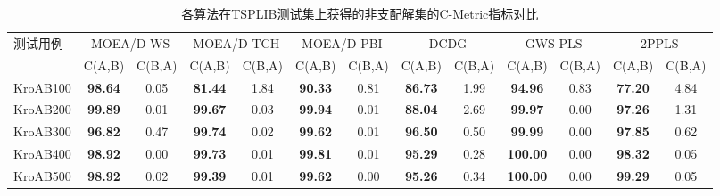 \begin{table}[h]
    \small
    \renewcommand\arraystretch{1.2}
    \renewcommand\tabcolsep{2pt}
    \centering
    \caption{各算法在TSPLIB测试集上获得的非支配解集的C-Metric指标对比 \label{tab:各算法在TSPLIB测试集上获得的非支配解集的C-Metric指标对比}}
    \begin{threeparttable}
        \begin{tabular}{lcccccccccccc}
            \toprule
            \multirow{2}[4]{*}{测试用例} & \multicolumn{2}{c}{MOEA/D-WS} & \multicolumn{2}{c}{MOEA/D-TCH} & \multicolumn{2}{c}{MOEA/D-PBI} & \multicolumn{2}{c}{DCDG} & \multicolumn{2}{c}{GWS-PLS} & \multicolumn{2}{c}{2PPLS} \\
            \cmidrule{2-13}    & C(A,B)         & C(B,A)       & C(A,B)           & C(B,A)          & C(A,B)          & C(B,A)         & C(A,B)          & C(B,A)        & C(A,B)          & C(B,A) & C(A,B)          & C(B,A) \\
            \midrule
            KroAB100                      & \textbf{98.64}                & 0.05                           & \textbf{81.44}                 & 1.84                     & \textbf{90.33}              & 0.81                      & \textbf{86.73}           & 1.99   & \textbf{94.96}  & 0.83   & \textbf{77.20}  & 4.84  \\
            KroAB200                      & \textbf{99.89}                & 0.01                           & \textbf{99.67}                 & 0.03                     & \textbf{99.94}              & 0.01                      & \textbf{88.04}           & 2.69   & \textbf{99.97}  & 0.00   & \textbf{97.26}  & 1.31  \\
            KroAB300                      & \textbf{96.82}                & 0.47                           & \textbf{99.74}                 & 0.02                     & \textbf{99.62}              & 0.01                      & \textbf{96.50}           & 0.50   & \textbf{99.99}  & 0.00   & \textbf{97.85}  & 0.62  \\
            KroAB400                      & \textbf{98.92}                & 0.00                           & \textbf{99.73}                 & 0.01                     & \textbf{99.81}              & 0.01                      & \textbf{95.29}           & 0.28   & \textbf{100.00} & 0.00   & \textbf{98.32}  & 0.05  \\
            KroAB500                      & \textbf{98.92}                & 0.02                           & \textbf{99.39}                 & 0.01                     & \textbf{99.62}              & 0.00                      & \textbf{95.26}           & 0.34   & \textbf{100.00} & 0.00   & \textbf{99.29}  & 0.05  \\

\end{tabular}
\end{threeparttable}
\end{table}
